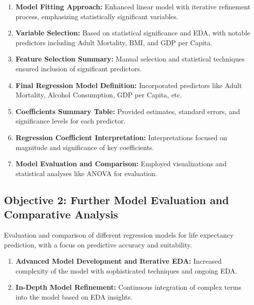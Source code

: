 \documentclass[
]{article}
\providecommand{\tightlist}{%
  \setlength{\itemsep}{0pt}\setlength{\parskip}{0pt}}
\begin{document}
\begin{enumerate}
\def\labelenumi{\arabic{enumi}.}
\tightlist
\item
  \textbf{Model Fitting Approach:} Enhanced linear model with iterative
  refinement process, emphasizing statistically significant variables.
\item
  \textbf{Variable Selection:} Based on statistical significance and
  EDA, with notable predictors including Adult Mortality, BMI, and GDP
  per Capita.
\item
  \textbf{Feature Selection Summary:} Manual selection and statistical
  techniques ensured inclusion of significant predictors.
\item
  \textbf{Final Regression Model Definition:} Incorporated predictors
  like Adult Mortality, Alcohol Consumption, GDP per Capita, etc.
\item
  \textbf{Coefficients Summary Table:} Provided estimates, standard
  errors, and significance levels for each predictor.
\item
  \textbf{Regression Coefficient Interpretation:} Interpretations
  focused on magnitude and significance of key coefficients.
\item
  \textbf{Model Evaluation and Comparison:} Employed visualizations and
  statistical analyses like ANOVA for evaluation.
\end{enumerate}

\hypertarget{objective-2-further-model-evaluation-and-comparative-analysis}{%
\subsection{Objective 2: Further Model Evaluation and Comparative
Analysis}\label{objective-2-further-model-evaluation-and-comparative-analysis}}

Evaluation and comparison of different regression models for life
expectancy prediction, with a focus on predictive accuracy and
suitability.

\begin{enumerate}
\def\labelenumi{\arabic{enumi}.}
\tightlist
\item
  \textbf{Advanced Model Development and Iterative EDA:} Increased
  complexity of the model with sophisticated techniques and ongoing EDA.
\item
  \textbf{In-Depth Model Refinement:} Continuous integration of complex
  terms into the model based on EDA insights.
\end{enumerate}
\end{document}
